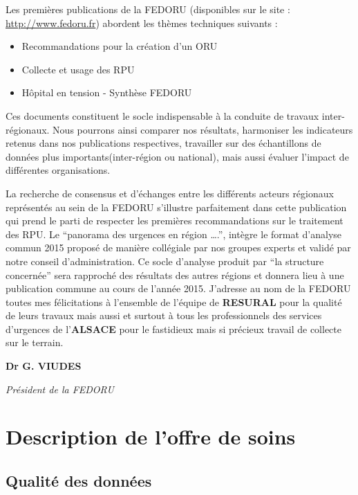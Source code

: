\documentclass[]{article}
\begin{document}
Les premières publications de la FEDORU (disponibles sur le site :
\url{http://www.fedoru.fr}) abordent les thèmes techniques suivants :

\begin{itemize}
\itemsep1pt\parskip0pt
\item
  Recommandations pour la création d'un ORU
\item
  Collecte et usage des RPU
\item
  Hôpital en tension - Synthèse FEDORU
\end{itemize}

Ces documents constituent le socle indispensable à la conduite de
travaux inter-régionaux. Nous pourrons ainsi comparer nos résultats,
harmoniser les indicateurs retenus dans nos publications respectives,
travailler sur des échantillons de données plus importants(inter-région
ou national), mais aussi évaluer l'impact de différentes organisations.

La recherche de consensus et d'échanges entre les différents acteurs
régionaux représentés au sein de la FEDORU s'illustre parfaitement dans
cette publication qui prend le parti de respecter les premières
recommandations sur le traitement des RPU. Le ``panorama des urgences en
région \ldots{}.'', intègre le format d'analyse commun 2015 proposé de
manière collégiale par nos groupes experts et validé par notre conseil
d'administration. Ce socle d'analyse produit par ``la structure
concernée'' sera rapproché des résultats des autres régions et donnera
lieu à une publication commune au cours de l'année 2015. J'adresse au
nom de la FEDORU toutes mes félicitations à l'ensemble de l'équipe de
\textbf{RESURAL} pour la qualité de leurs travaux mais aussi et surtout
à tous les professionnels des services d'urgences de l'\textbf{ALSACE}
pour le fastidieux mais si précieux travail de collecte sur le terrain.

\textbf{Dr G. VIUDES}

\emph{Président de la FEDORU}

\section{Description de l'offre de
soins}\label{description-de-loffre-de-soins}

\subsection{Qualité des données}\label{qualite-des-donnees}
\end{document}
